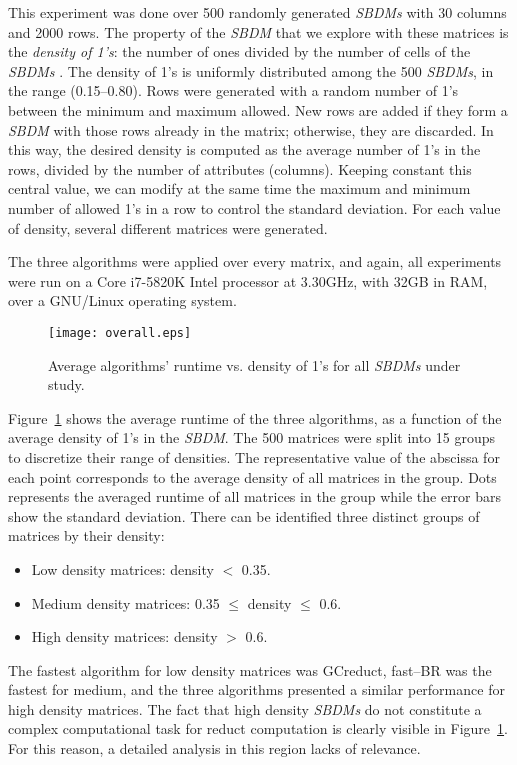 \documentclass[authoryear,preprint,review,12pt]{elsarticle}
\begin{document}
	This experiment was done over 500 randomly generated \textit{SBDMs} with 30 columns and 2000 rows. The property of the \textit{SBDM} that we explore with these matrices is the \emph{density of 1's}: the number of ones divided by the number of cells of the \textit{SBDMs} \citep{Rojas12,Lias13,Rodriguez15}. The density of 1's is uniformly distributed among the 500 \textit{SBDMs}, in the range (0.15--0.80). Rows were generated with a random number of 1's between the minimum and maximum allowed. New rows are added if they form a \textit{SBDM} with those rows already in the matrix; otherwise, they are discarded. In this way, the desired density is computed as the average number of 1's in the rows, divided by the number of attributes (columns). Keeping constant this central value, we can modify at the same time the maximum and minimum number of	allowed 1's in a row to control the standard deviation. For each value of density, several different matrices were generated. 
	
	The three algorithms were applied over every matrix, and again, all experiments were run on a Core i7-5820K Intel processor at 3.30GHz, with 32GB in RAM, over a GNU/Linux operating system.
			
	\begin{figure}[htb]
		\begin{center}
			\texttt{[image: overall.eps]}
		\end{center}
		\caption{Average algorithms' runtime vs. density of 1's for all \textit{SBDMs} under study.}
		\label{fig:scattDensity}
	\end{figure}	

	Figure~\ref{fig:scattDensity} shows the average runtime of the three algorithms, as a function of 
	the average density of 1's in the \textit{SBDM}. The 500 matrices were split into 15 groups to discretize their range of densities. The representative value of the abscissa for each point corresponds to the average density of all matrices in the group. Dots represents the averaged runtime of all matrices in the group while the error bars show the standard deviation. There can be identified three distinct groups of matrices by their density:
	\begin{itemize}
	\item Low density matrices: density $<$ 0.35.
	\item Medium density matrices: 0.35 $\leq$ density $\leq$ 0.6.
	\item High density matrices: density $>$ 0.6.
	\end{itemize}
	The fastest algorithm for low density matrices was GCreduct, fast--BR was the fastest for medium, and the three algorithms presented a similar performance for high	density matrices. The fact that high density \textit{SBDMs} do not constitute a complex computational task for reduct computation \citep{Rojas12} is clearly visible in Figure~\ref{fig:scattDensity}. For this reason, a detailed analysis in this region lacks of relevance.
	
\end{document}
